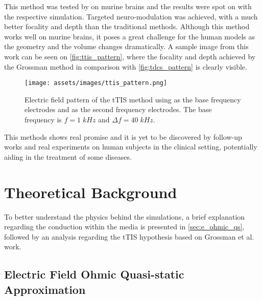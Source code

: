 This method was tested by  on murine brains and the results were spot on with the respective simulation. Targeted neuro-modulation was achieved, with a much better focality and depth than the traditional methods. Although this method works well on murine brains, it poses a great challenge for the human models as the geometry and the volume changes dramatically. A sample image from this work can be seen on \autoref{fig:ttis_pattern}, where the focality and depth achieved by the Grossman method in comparison with \autoref{fig:tdcs_pattern} is clearly visible.

\begin{figure}[H]
    \centering
    \texttt{[image: assets/images/ttis\_pattern.png]}
    \caption{Electric field pattern of the \gls{tTIS} method using  as the base frequency electrodes and  as the second frequency electrodes. The base frequency is $f = 1\; kHz$ and $\Delta f=40\; kHz$.}
    \label{fig:ttis_pattern}
\end{figure}

This methods shows real promise and it is yet to be discovered by follow-up works and real experiments on human subjects in the clinical setting, potentially aiding in the treatment of some diseases.

\section{Theoretical Background}

To better understand the physics behind the simulations, a brief explanation regarding the conduction within the media is presented in \autoref{sec:e_ohmic_qs}, followed by an analysis regarding the \gls{tTIS} hypothesis based on Grossman et al.\cite{Grossman2017} work.

\subsection{Electric Field Ohmic Quasi-static Approximation}
\label{sec:e_ohmic_qs}

